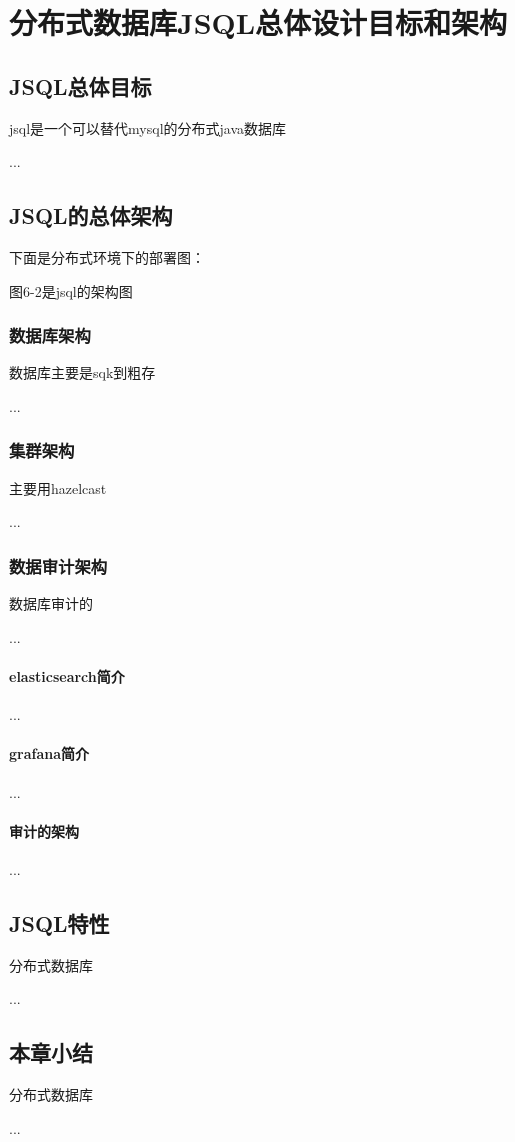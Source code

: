 
\chapter{分布式数据库JSQL总体设计目标和架构}
\section{JSQL总体目标}
jsql是一个可以替代mysql的分布式java数据库

...
\section{JSQL的总体架构}
下面是分布式环境下的部署图：


图6-2是jsql的架构图


\subsection{数据库架构}
数据库主要是sqk到粗存

...
\subsection{集群架构}
主要用hazelcast

...
\subsection{数据审计架构}
数据库审计的

...
\subsubsection{elasticsearch简介}
...
\subsubsection{grafana简介}
...
\subsubsection{审计的架构}
...
\section{JSQL特性}
分布式数据库

...
\section{本章小结}
分布式数据库

...